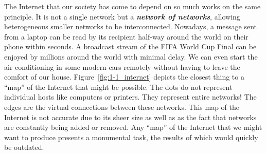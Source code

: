 The Internet that our society has come to depend on so much works on the same principle.
It is not a single network but a \textit{\textbf{network of networks}}, allowing heterogeneous smaller networks to be interconnected.
Nowadays, a message sent from a laptop can be read by its recipient half-way around the world on their phone within seconds.
A broadcast stream of the FIFA World Cup Final can be enjoyed by millions around the world with minimal delay.
We can even start the air conditioning in some modern cars remotely without having to leave the comfort of our house.
Figure~\ref{fig:1-1_internet} depicts the closest thing to a ``map'' of the Internet that might be possible.
The dots do not represent individual hosts like computers or printers.
They represent entire networks!
The edges are the virtual connections between these networks.
This map of the Internet is not accurate due to its sheer size as well as as the fact that networks are constantly being added or removed.
Any ``map'' of the Internet that we might want to produce presents a monumental task, the results of which would quickly be outdated.



